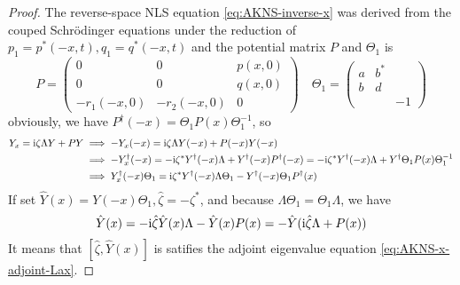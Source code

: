 \begin{proof}
    The reverse-space NLS equation \eqref{eq:AKNS-inverse-x} was derived from the couped Schrödinger equations under the reduction of $p_{1} = p^{*}(-x,t), q_{1} = q^{*}(-x,t) $ and the potential matrix $ P $ and $\Theta_1$ is 
    \begin{equation}
        P = \begin{pmatrix}
            0 & 0 & p(x,0) \\ 0 & 0 & q(x,0) \\ -r_{1}(-x,0) & -r_{2}(-x,0) & 0 
        \end{pmatrix} \quad \Theta_1 = \begin{pmatrix}
            a & b^{*} & \\ b & d & \\ & & -1 
        \end{pmatrix}
    \end{equation}
    obviously, we have $ P^\dagger(-x) = \Theta_{1} P(x) \Theta_{1}^{-1} $, so 
    \begin{equation}
        \begin{aligned}
            Y_{x} = \mathrm{i} \zeta \Lambda Y + PY &\implies -Y_{x}(-x) = \mathrm{i} \zeta \Lambda Y(-x) + P(-x)Y(-x) \\
            &\implies -Y_{x}^{\dagger}(-x) = -\mathrm{i} \zeta^{*} Y^{\dagger}(-x) \Lambda + Y^{\dagger}(-x) P^{\dagger}(-x)= -\mathrm{i} \zeta^{*}Y^{\dagger}(-x) \Lambda + Y^{\dagger}\Theta_{1} P(x) \Theta_{1}^{-1} \\
            &\implies Y_{x}^{\dagger}(-x) \Theta_{1} = \mathrm{i} \zeta^{*} Y^{\dagger}(-x) \Lambda \Theta_{1} - Y^{\dagger}(-x) \Theta_{1} P^{\dagger}(x) \\
        \end{aligned}
    \end{equation}
    If set $ \hat{Y}(x) = Y(-x)\Theta_{1}, \hat{\zeta} = -\zeta^{*} $, and because $ \Lambda \Theta_{1} = \Theta_{1} \Lambda $, we have
    \begin{equation}
         \hat{Y}(x) = -\mathrm{i} \hat{\zeta} \hat{Y}(x) \Lambda - \hat{Y}(x) P(x) = -\hat{Y}(\mathrm{i} \hat{\zeta} \Lambda + P(x)) 
    \end{equation}
    It means that $ [\hat{\zeta}, \hat{Y}(x)] $ is satifies the adjoint eigenvalue equation \eqref{eq:AKNS-x-adjoint-Lax}.
\end{proof}
